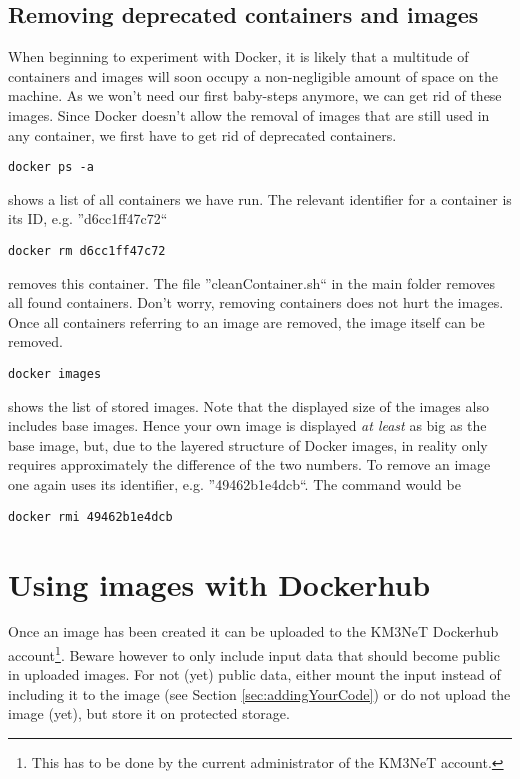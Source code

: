 \documentclass[a4paper, twoside, 11pt]{article}
\begin{document}
\subsection{Removing deprecated containers and images}
When beginning to experiment with Docker, it is likely that a multitude of containers and images will  
soon occupy a non-negligible amount of space on the machine. 
As we won't need our first baby-steps anymore, we can get rid of these images. 
Since Docker doesn't allow the removal of images that are still used in any container, 
we first have to get rid of deprecated containers. 
\begin{lstlisting}[basicstyle=\ttfamily\small,columns=flexible,keepspaces=true,frame=single]
docker ps -a
\end{lstlisting}
shows a list of all containers we have run. 
The relevant identifier for a container is its ID, e.g. ''d6cc1ff47c72``
\begin{lstlisting}[basicstyle=\ttfamily\small,columns=flexible,keepspaces=true,frame=single]
docker rm d6cc1ff47c72
\end{lstlisting}
removes this container. 
The file ''cleanContainer.sh`` in the main folder removes all found containers. 
Don't worry, removing containers does not hurt the images. 
Once all containers referring to an image are removed, the image itself can be removed.
\begin{lstlisting}[basicstyle=\ttfamily\small,columns=flexible,keepspaces=true,frame=single]
docker images
\end{lstlisting}
shows the list of stored images. 
Note that the displayed size of the images also includes base images. 
Hence your own image is displayed \textit{at least} as big as the base image, 
but, due to the layered structure of Docker images, in reality only requires approximately the difference of the two numbers. 
To remove an image one again uses its identifier, e.g. ''49462b1e4dcb``. 
The command would be 
\begin{lstlisting}[basicstyle=\ttfamily\small,columns=flexible,keepspaces=true,frame=single]
docker rmi 49462b1e4dcb
\end{lstlisting}

\section{Using images with Dockerhub}

Once an image has been created it can be uploaded to the 
KM3NeT Dockerhub account\footnote{This has to be done by the current administrator of the KM3NeT account.}. 
Beware however to only include input data that should become public in uploaded images. 
For not (yet) public data, either mount the input instead of including 
it to the image (see Section \ref{sec:addingYourCode}) 
or do not upload the image (yet), but store it on protected storage. 
\end{document}
